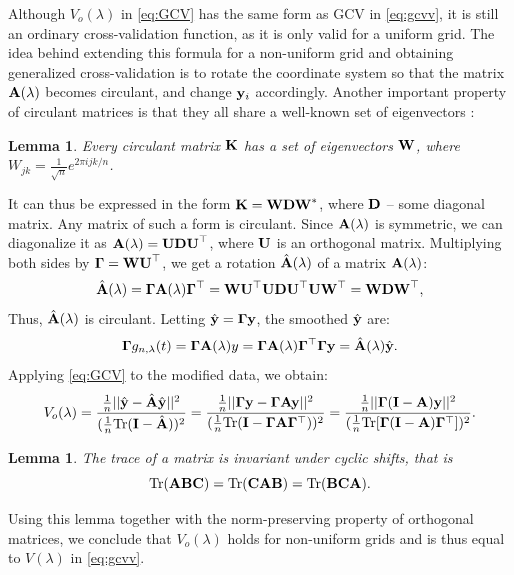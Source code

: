 \documentclass[11pt,leqno]{book}
\theoremstyle{definition}
\theoremstyle{plain}
\newtheorem{lemma}[theorem]{Lemma}
\theoremstyle{definition}
\begin{document}
{Although $V_o(\lambda)$ in \eqref{eq:GCV} has the same form as GCV in \eqref{eq:gcvv}, it is still an ordinary cross-validation function, as it is only valid for a uniform grid. The idea behind extending this formula for a non-uniform grid and obtaining generalized cross-validation is to rotate the coordinate system so that the matrix $\vb{A}(\lambda)$ becomes circulant, and change $\vb{y}_i$ accordingly. Another important property of circulant matrices is that they all share a well-known set of eigenvectors \cite{circulant}:
\begin{lemma}\textit{
    Every circulant matrix $\vb{K}$ has a set of eigenvectors $\vb{W}$, where ${W}_{jk}=\frac{1}{\sqrt{n}}e^{2\pi ijk/n}$.}
\end{lemma}
\noindent It can thus be expressed in the form $\vb{K}=\vb{WDW}^*$, where $\vb{D}$ -- some diagonal matrix. Any matrix of such a form is circulant. Since $\vb{A}(\lambda)$ is symmetric, we can diagonalize it as $\vb{A}(\lambda)=\vb{UDU}^\top $, where $\vb{U}$ is an orthogonal matrix. Multiplying both sides by $\vb{\Gamma}=\vb{WU}^\top $, we get a rotation $\hat{\vb{A}}(\lambda)$ of a matrix $\vb{A}(\lambda)$:
\[
\hat{\vb{A}}(\lambda)=\vb{\Gamma A}(\lambda)\vb{\Gamma}^\top =\vb{WU^\top UDU^\top UW^\top} =\vb{WDW}^\top ,
\]
Thus, $\hat{\vb{A}}(\lambda)$ is circulant. Letting $\hat{\vb{y}}=\vb{\Gamma y}$, the smoothed $\hat{\vb{y}}$ are:
\[\vb{\Gamma} {g_{n,\lambda}(t)}=\vb{\Gamma A}(\lambda)y=\vb{\Gamma A}(\lambda)\vb{\Gamma^\top \Gamma y}= \hat{\vb{A}}(\lambda)\hat{\vb{y}}.\]
Applying \eqref{eq:GCV} to the modified data, we obtain:
\[
{V}_o(\lambda)=\frac{\frac{1}{n}||\hat{\vb{y}} -\hat{\vb{A}}\hat{\vb{y}}||^2}{(\frac{1}{n}\text{Tr}(\vb{I}-\hat{\vb{A}}))^2}=\frac{\frac{1}{n}||\vb{\Gamma} \vb{y}- \vb{\Gamma Ay}||^2}{(\frac{1}{n}\text{Tr}(\vb{I}-\vb{\Gamma A\Gamma^\top}))^2}=\frac{\frac{1}{n}||\vb{\Gamma}(\vb{I} -\vb{A})\vb{y}||^2}{(\frac{1}{n}\text{Tr}[\vb{\Gamma}(\vb{I}-\vb{A})\vb{\Gamma}^\top ])^2}.
\]
\begin{lemma}
\textit{The trace of a matrix is invariant under cyclic shifts, that is} \[
\textnormal{Tr}(\vb{ABC})=\textnormal{Tr}(\vb{CAB})=\textnormal{Tr}(\vb{BCA}).
\]
\end{lemma}
\noindent Using this lemma together with the norm-preserving property of orthogonal matrices, we conclude that ${V}_o(\lambda)$ holds for non-uniform grids and is thus equal to $V(\lambda)$ in \eqref{eq:gcvv}.

}
\end{document}
